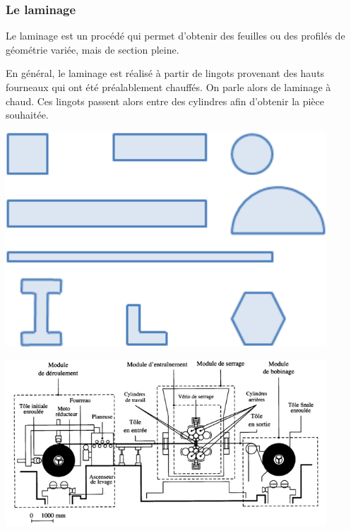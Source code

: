 \documentclass[11pt,oneside]{article}
\begin{document}
\subsubsection{Le laminage}
\begin{minipage}[c]{.55\linewidth}
Le laminage est un procédé qui permet d'obtenir des feuilles ou des profilés de géométrie variée, mais de section pleine. 

En général, le laminage est réalisé à partir de lingots provenant des hauts fourneaux qui ont été préalablement chauffés. On parle alors de laminage à chaud. Ces lingots passent alors entre des cylindres afin d'obtenir la pièce souhaitée. 
\end{minipage} \hfill
\begin{minipage}[c]{.4\linewidth}
\begin{center}
\includegraphics[width=0.9\textwidth]{png/profiles}
\end{center}
\end{minipage}
\begin{center}
\includegraphics[width=0.9\textwidth]{png/laminoir}
\end{center}
\end{document}
